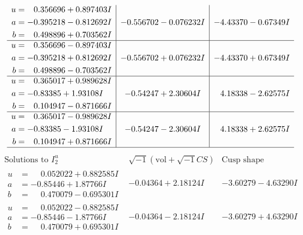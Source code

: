 \documentclass[1p]{elsarticle_modified}
\theoremstyle{definition}
\newcommand{\I}{\sqrt{-1}}
\begin{document}
$$\begin{array}{c|c|c}
\begin{aligned}
u &= \phantom{-}0.356696 + 0.897403 I \\
a &= -0.395218 - 0.812692 I \\
b &= \phantom{-}0.498896 + 0.703562 I\end{aligned}
 & -0.556702 - 0.076232 I & -4.43370 - 0.67349 I \\ \hline\begin{aligned}
u &= \phantom{-}0.356696 - 0.897403 I \\
a &= -0.395218 + 0.812692 I \\
b &= \phantom{-}0.498896 - 0.703562 I\end{aligned}
 & -0.556702 + 0.076232 I & -4.43370 + 0.67349 I \\ \hline\begin{aligned}
u &= \phantom{-}0.365017 + 0.989628 I \\
a &= -0.83385 + 1.93108 I \\
b &= \phantom{-}0.104947 - 0.871666 I\end{aligned}
 & -0.54247 + 2.30604 I & \phantom{-}4.18338 - 2.62575 I \\ \hline\begin{aligned}
u &= \phantom{-}0.365017 - 0.989628 I \\
a &= -0.83385 - 1.93108 I \\
b &= \phantom{-}0.104947 + 0.871666 I\end{aligned}
 & -0.54247 - 2.30604 I & \phantom{-}4.18338 + 2.62575 I\\
 \hline 
 \end{array}$$\newpage$$\begin{array}{c|c|c}  
\text{Solutions to }I^u_{2}& \I (\text{vol} + \sqrt{-1}CS) & \text{Cusp shape}\\
 \hline 
\begin{aligned}
u &= \phantom{-}0.052022 + 0.882585 I \\
a &= -0.85446 + 1.87766 I \\
b &= \phantom{-}0.470079 - 0.695301 I\end{aligned}
 & -0.04364 + 2.18124 I & -3.60279 - 4.63290 I \\ \hline\begin{aligned}
u &= \phantom{-}0.052022 - 0.882585 I \\
a &= -0.85446 - 1.87766 I \\
b &= \phantom{-}0.470079 + 0.695301 I\end{aligned}
 & -0.04364 - 2.18124 I & -3.60279 + 4.63290 I \\ \hline\begin{aligned}

\end{aligned}
\end{array}$$
\end{document}
